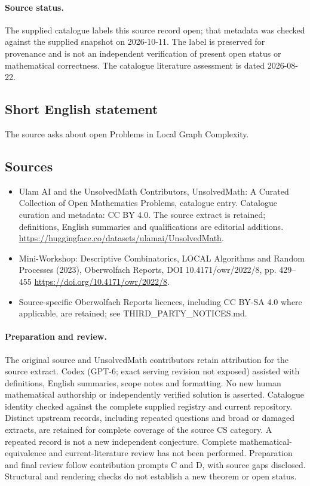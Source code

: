 \documentclass[11pt]{article}
\begin{document}
\paragraph{Source status.}
The supplied catalogue labels this source record open; that metadata was checked against the supplied snapshot on 2026-10-11. The label is preserved for provenance and is not an independent verification of present open status or mathematical correctness. The catalogue literature assessment is dated 2026-08-22.
\subsection{Short English statement}
The source asks about open Problems in Local Graph Complexity.
\subsection{Sources}
\begin{itemize}
\item[\hypertarget{source:statement:1}{S1}] Ulam AI and the UnsolvedMath Contributors, UnsolvedMath: A Curated Collection of Open Mathematics Problems, catalogue entry. Catalogue curation and metadata: CC BY 4.0. The source extract is retained; definitions, English summaries and qualifications are editorial additions.
\url{https://huggingface.co/datasets/ulamai/UnsolvedMath}.
\item[\hypertarget{source:statement:2}{S2}] Mini-Workshop: Descriptive Combinatorics, LOCAL Algorithms and Random Processes (2023), Oberwolfach Reports, DOI 10.4171/owr/2022/8, pp. 429--455
\url{https://doi.org/10.4171/owr/2022/8}.
\item Source-specific Oberwolfach Reports licences, including CC BY-SA 4.0 where applicable, are retained; see THIRD\_PARTY\_NOTICES.md.
\end{itemize}
\paragraph{Preparation and review.}
The original source and UnsolvedMath contributors retain attribution for the source extract. Codex (GPT-6; exact serving revision not exposed) assisted with definitions, English summaries, scope notes and formatting. No new human mathematical authorship or independently verified solution is asserted. Catalogue identity checked against the complete supplied registry and current repository. Distinct upstream records, including repeated questions and broad or damaged extracts, are retained for complete coverage of the source CS category. A repeated record is not a new independent conjecture. Complete mathematical-equivalence and current-literature review has not been performed. Preparation and final review follow contribution prompts C and D, with source gaps disclosed. Structural and rendering checks do not establish a new theorem or open status.
\label{end:statement}
\end{document}
